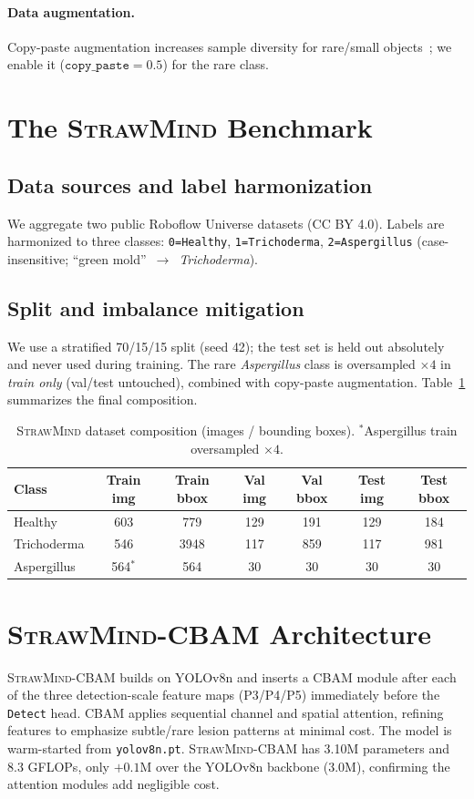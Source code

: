 \documentclass[11pt]{article}
\newcommand{\sm}{\textsc{StrawMind}}
\newcommand{\smc}{\textsc{StrawMind-CBAM}}
\begin{document}
\paragraph{Data augmentation.} Copy-paste augmentation increases sample diversity for rare/small
objects~\cite{zhang2023copypaste}; we enable it ($\texttt{copy\_paste}=0.5$) for the rare class.

\section{The \sm{} Benchmark}
\subsection{Data sources and label harmonization}
We aggregate two public Roboflow Universe datasets (CC BY 4.0). Labels are harmonized to three
classes: \texttt{0=Healthy}, \texttt{1=Trichoderma}, \texttt{2=Aspergillus} (case-insensitive;
``green mold''~$\rightarrow$~\emph{Trichoderma}).
\subsection{Split and imbalance mitigation}
We use a stratified 70/15/15 split (seed 42); the test set is held out absolutely and never used
during training. The rare \emph{Aspergillus} class is oversampled $\times4$ in \emph{train only}
(val/test untouched), combined with copy-paste augmentation. Table~\ref{tab:dataset} summarizes the
final composition.
\begin{table}[t]\centering\small
\caption{\sm{} dataset composition (images / bounding boxes). $^{*}$Aspergillus train oversampled $\times4$.}
\label{tab:dataset}
\begin{tabular}{lcccccc}
\toprule
Class & Train img & Train bbox & Val img & Val bbox & Test img & Test bbox\\
\midrule
Healthy     & 603  & 779  & 129 & 191 & 129 & 184\\
Trichoderma & 546  & 3948 & 117 & 859 & 117 & 981\\
Aspergillus & 564$^{*}$ & 564 & 30 & 30 & 30 & 30\\
\bottomrule
\end{tabular}
\end{table}

\section{\smc{} Architecture}
\smc{} builds on YOLOv8n and inserts a CBAM module after each of the three detection-scale feature
maps (P3/P4/P5) immediately before the \texttt{Detect} head. CBAM applies sequential channel and
spatial attention, refining features to emphasize subtle/rare lesion patterns at minimal cost.
The model is warm-started from \texttt{yolov8n.pt}. \smc{} has 3.10M parameters and 8.3 GFLOPs, only $+0.1$M over the YOLOv8n backbone (3.0M), confirming the attention modules add negligible cost.
\end{document}
